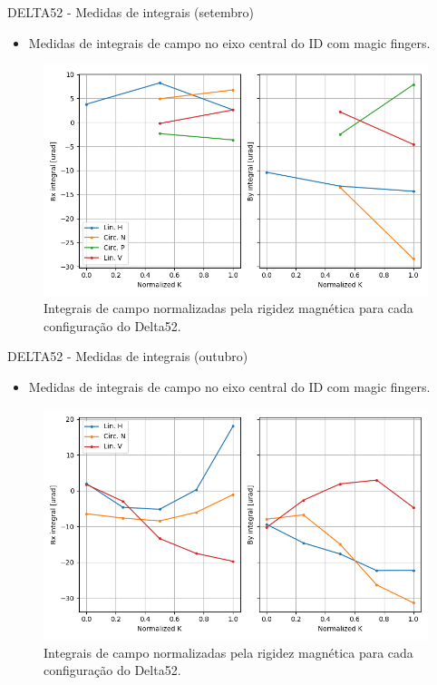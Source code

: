 \documentclass{beamer}					  %
\begin{document}
\begin{frame}{DELTA52 - Medidas de integrais (setembro)}
\begin{itemize}
        \item Medidas de integrais de campo no eixo central do ID com magic fingers.
	\end{itemize}
\begin{figure}[H]
		\centering
        \includegraphics[width=1\textwidth]{2023-10-27/figures/field_integrals_config.png}
        \caption{Integrais de campo normalizadas pela rigidez magnética para cada configuração do Delta52.}
        \label{fig:integrals_config}
    \end{figure}
\end{frame}

\begin{frame}{DELTA52 - Medidas de integrais (outubro)}
\begin{itemize}
        \item Medidas de integrais de campo no eixo central do ID com magic fingers.
	\end{itemize}
\begin{figure}[H]
		\centering
        \includegraphics[width=1\textwidth]{2023-10-27/figures/field_integrals_config_new.png}
        \caption{Integrais de campo normalizadas pela rigidez magnética para cada configuração do Delta52.}
        \label{fig:integrals_config_new}
    \end{figure}
\end{frame}
\end{document}
